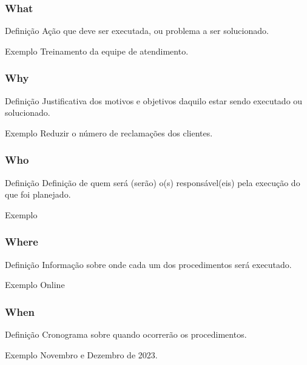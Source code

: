 \documentclass[aspectratio=169]{beamer}
\begin{document}
\begin{frame}
	\frametitle{What}

	\begin{block}{Defini\c cão}
		 Ação que deve ser executada, ou problema a ser solucionado.
	\end{block}\vfill
	
	\begin{exampleblock}{Exemplo}
		Treinamento da equipe de atendimento.
	\end{exampleblock}
\end{frame}

\begin{frame}
	\frametitle{Why}

	\begin{block}{Defini\c cão}
		 Justificativa dos motivos e objetivos daquilo estar sendo executado ou solucionado.
	\end{block}\vfill
	
	\begin{exampleblock}{Exemplo}
		Reduzir o número de reclama\c cões dos clientes.
	\end{exampleblock}
\end{frame}

\begin{frame}
	\frametitle{Who}

	\begin{block}{Defini\c cão}
		Definição de quem será (serão) o(s) responsável(eis) pela execução do que foi planejado.
	\end{block}\vfill
	
	\begin{exampleblock}{Exemplo}

	\end{exampleblock}
\end{frame}

\begin{frame}
	\frametitle{Where}

	\begin{block}{Defini\c cão}
		 Informação sobre onde cada um dos procedimentos será executado.
	\end{block}\vfill
	
	\begin{exampleblock}{Exemplo}
		Online
	\end{exampleblock}
\end{frame}

\begin{frame}
	\frametitle{When}

	\begin{block}{Defini\c cão}
		 Cronograma sobre quando ocorrerão os procedimentos.
	\end{block}\vfill
	
	\begin{exampleblock}{Exemplo}
		Novembro e Dezembro de 2023.
	\end{exampleblock}
\end{frame}
\end{document}
